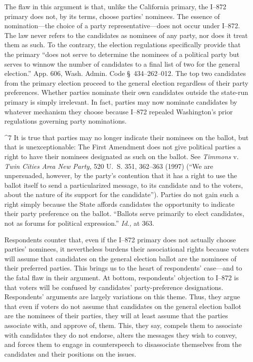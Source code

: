   The flaw in this argument is that, unlike the California primary, the
I--872 primary does not, by its terms, choose parties' nominees. The
essence of nomination---the choice of a party representative---does
not occur under I--872. The law never refers to the candidates as
nominees of any party, nor does it treat them as such. To the contrary,
the election regulations specifically provide that the primary ``does
not serve to determine the nominees of a political party but serves to
winnow the number of candidates to a final list of two for the general
election.'' App. 606, Wash. Admin. Code \S~434--262--012. The
top two candidates from the primary election proceed to the general
election regardless of their party preferences. Whether parties nominate
their own candidates outside the state-run primary is simply irrelevant.
In fact, parties may now nominate candidates by whatever mechanism
they choose because I--872 repealed Washington's prior regulations
governing party nominations.\footnotemark[7]

^7 It is true that parties may no longer indicate their nominees on the
ballot, but that is unexceptionable: The First Amendment does not give
political parties a right to have their nominees designated as such
on the ballot. See \emph{Timmons} v. \emph{Twin Cities Area New Party,}
520 U.~S. 351, 362--363 (1997) (``We are unpersuaded, however, by
the party's contention that it has a right to use the ballot itself
to send a particularized message, to its candidate and to the voters,
about the nature of its support for the candidate''). Parties do
not gain such a right simply because the State affords candidates the
opportunity to indicate their party preference on \newpage  the ballot.
``Ballots serve primarily to elect candidates, not as forums for
political expression.'' \emph{Id.,} at 363.\newpage 

  Respondents counter that, even if the I--872 primary does not
actually choose parties' nominees, it nevertheless burdens their
associational rights because voters will assume that candidates on the
general election ballot are the nominees of their preferred parties.
This brings us to the heart of respondents' case---and to the fatal
flaw in their argument. At bottom, respondents' objection to I--872
is that voters will be confused by candidates' party-preference
designations. Respondents' arguments are largely variations on
this theme. Thus, they argue that even if voters do not assume that
candidates on the general election ballot are the nominees of their
parties, they will at least assume that the parties associate with,
and approve of, them. This, they say, compels them to associate with
candidates they do not endorse, alters the messages they wish to convey,
and forces them to engage in counterspeech to disassociate themselves
from the candidates and their positions on the issues.

